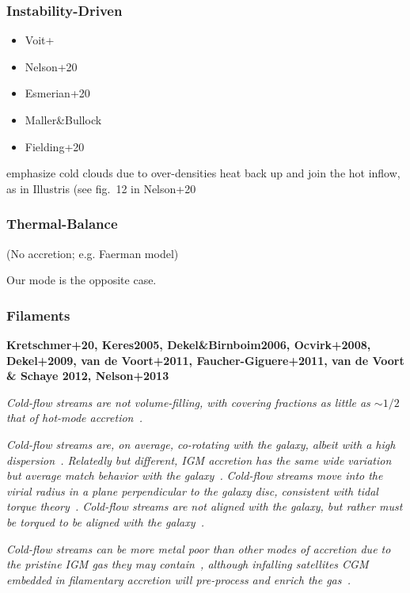 \documentclass[fleqn,usenatbib]{mnras}
\begin{document}
\subsubsection{Instability-Driven}

\begin{itemize}
\item Voit+
\item  Nelson+20
\item  Esmerian+20
\item  Maller\&Bullock
\item Fielding+20
\end{itemize}
emphasize cold clouds due to over-densities heat back up and join the hot inflow, as in Illustris (see fig.~12 in Nelson+20

\subsubsection{Thermal-Balance}

(No accretion; e.g. Faerman model)

Our mode is the opposite case.

\subsubsection{Filaments}

\textbf{
Kretschmer+20,
Keres2005,
Dekel\&Birnboim2006,
Ocvirk+2008,
Dekel+2009,
van de Voort+2011,
Faucher-Giguere+2011,
van de Voort \& Schaye 2012,
Nelson+2013
}

\textit{
Cold-flow streams are not volume-filling, with covering fractions as little as $\sim 1/2$ that of hot-mode accretion~\citep[e.g.][]{wrightRevealingPhysicalProperties2021}.
}

\textit{
Cold-flow streams are, on average, co-rotating with the galaxy, albeit with a high dispersion~\citep[e.g.][]{stewartOrbitingCircumgalacticGas2011, danovich2012, stewartAngularMomentumAcquisition2013, Stewart2016}.
Relatedly but different, IGM accretion has the same wide variation but average match behavior with the galaxy~\citep{hafenOriginsCircumgalacticMedium2019}.
}
\textit{
Cold-flow streams move into the virial radius in a plane perpendicular to the galaxy disc, consistent with tidal torque theory~\citep{danovich2012}.
Cold-flow streams are not aligned with the galaxy, but rather must be torqued to be aligned with the galaxy~\cite{danovich2012, danovich2015}.
}

\textit{
Cold-flow streams can be more metal poor than other modes of accretion due to the pristine IGM gas they may contain~\citep[e.g.][]{wrightRevealingPhysicalProperties2021}, although infalling satellites CGM embedded in filamentary accretion will pre-process and enrich the gas~\citep[e.g.][]{hafenOriginsCircumgalacticMedium2019}.
}
\end{document}
